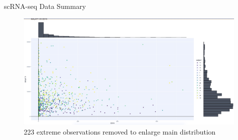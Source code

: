 \documentclass[11pt]{beamer}
\begin{document}
\begin{frame}{scRNA-seq Data Summary}
\begin{figure}
\centering
\includegraphics[width=1.07\textwidth]{2019-11-24_21-52-37.jpeg}
\caption{223 extreme observations removed to enlarge main distribution}
\end{figure}
\end{frame}
\end{document}

